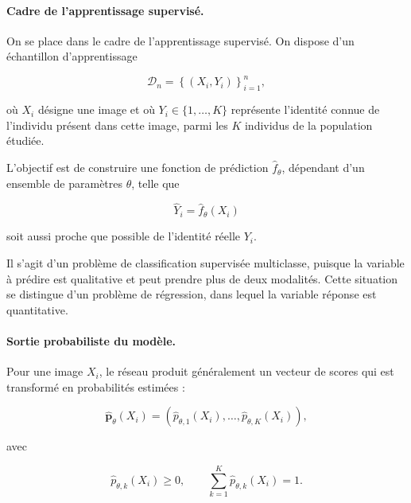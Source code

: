 \documentclass[11pt,a4paper]{report}
\begin{document}
\paragraph{Cadre de l'apprentissage supervisé.}

On se place dans le cadre de l'apprentissage supervisé. On dispose d'un
échantillon d'apprentissage

\begin{equation}
    \mathcal{D}_n = \left\{(X_i,Y_i)\right\}_{i=1}^{n},
\end{equation}

où $X_i$ désigne une image et où $Y_i \in \{1,\ldots,K\}$ représente
l'identité connue de l'individu présent dans cette image, parmi les $K$
individus de la population étudiée.

L'objectif est de construire une fonction de prédiction
$\widehat{f}_{\theta}$, dépendant d'un ensemble de paramètres $\theta$, telle que

\begin{equation}
    \widehat{Y}_i = \widehat{f}_{\theta}(X_i)
\end{equation}

soit aussi proche que possible de l'identité réelle $Y_i$.

Il s'agit d'un problème de classification supervisée multiclasse, puisque la
variable à prédire est qualitative et peut prendre plus de deux modalités.
Cette situation se distingue d'un problème de régression, dans lequel la
variable réponse est quantitative.

\paragraph{Sortie probabiliste du modèle.}

Pour une image $X_i$, le réseau produit généralement un vecteur de scores qui
est transformé en probabilités estimées :

\begin{equation}
    \widehat{\boldsymbol{p}}_{\theta}(X_i)
    =
    \left(
        \widehat{p}_{\theta,1}(X_i),
        \ldots,
        \widehat{p}_{\theta,K}(X_i)
    \right),
\end{equation}

avec

\begin{equation}
    \widehat{p}_{\theta,k}(X_i) \geq 0,
    \qquad
    \sum_{k=1}^{K}
    \widehat{p}_{\theta,k}(X_i)=1.
\end{equation}
\end{document}
